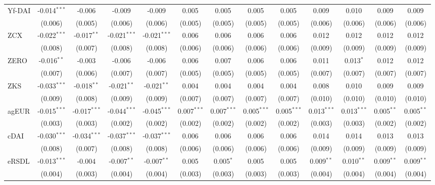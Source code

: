 \begin{table}[!htbp]
\begin{tabular}{@{\extracolsep{5pt}}lcccccccccccc}
 Yf-DAI & -0.014$^{***}$ & -0.006$^{}$ & -0.009$^{}$ & -0.009$^{}$ & 0.005$^{}$ & 0.005$^{}$ & 0.005$^{}$ & 0.005$^{}$ & 0.009$^{}$ & 0.010$^{}$ & 0.009$^{}$ & 0.009$^{}$ \\
  & (0.006) & (0.005) & (0.006) & (0.006) & (0.005) & (0.005) & (0.005) & (0.005) & (0.006) & (0.006) & (0.006) & (0.006) \\
 ZCX & -0.022$^{***}$ & -0.017$^{**}$ & -0.021$^{***}$ & -0.021$^{***}$ & 0.006$^{}$ & 0.006$^{}$ & 0.006$^{}$ & 0.006$^{}$ & 0.012$^{}$ & 0.012$^{}$ & 0.012$^{}$ & 0.012$^{}$ \\
  & (0.008) & (0.007) & (0.008) & (0.008) & (0.006) & (0.006) & (0.006) & (0.006) & (0.009) & (0.009) & (0.009) & (0.009) \\
 ZERO & -0.016$^{**}$ & -0.003$^{}$ & -0.006$^{}$ & -0.006$^{}$ & 0.006$^{}$ & 0.007$^{}$ & 0.006$^{}$ & 0.006$^{}$ & 0.011$^{}$ & 0.013$^{*}$ & 0.012$^{}$ & 0.012$^{}$ \\
  & (0.007) & (0.006) & (0.007) & (0.007) & (0.005) & (0.005) & (0.005) & (0.005) & (0.007) & (0.007) & (0.007) & (0.007) \\
 ZKS & -0.033$^{***}$ & -0.018$^{**}$ & -0.021$^{**}$ & -0.021$^{**}$ & 0.004$^{}$ & 0.004$^{}$ & 0.004$^{}$ & 0.004$^{}$ & 0.008$^{}$ & 0.010$^{}$ & 0.009$^{}$ & 0.009$^{}$ \\
  & (0.009) & (0.008) & (0.009) & (0.009) & (0.007) & (0.007) & (0.007) & (0.007) & (0.010) & (0.010) & (0.010) & (0.010) \\
 agEUR & -0.015$^{***}$ & -0.017$^{***}$ & -0.044$^{***}$ & -0.045$^{***}$ & 0.007$^{***}$ & 0.007$^{***}$ & 0.005$^{***}$ & 0.005$^{***}$ & 0.013$^{***}$ & 0.013$^{***}$ & 0.005$^{**}$ & 0.005$^{**}$ \\
  & (0.003) & (0.003) & (0.002) & (0.002) & (0.002) & (0.002) & (0.002) & (0.002) & (0.003) & (0.003) & (0.002) & (0.002) \\
 cDAI & -0.030$^{***}$ & -0.034$^{***}$ & -0.037$^{***}$ & -0.037$^{***}$ & 0.006$^{}$ & 0.006$^{}$ & 0.006$^{}$ & 0.006$^{}$ & 0.014$^{}$ & 0.014$^{}$ & 0.013$^{}$ & 0.013$^{}$ \\
  & (0.008) & (0.007) & (0.008) & (0.008) & (0.006) & (0.006) & (0.006) & (0.006) & (0.009) & (0.009) & (0.009) & (0.009) \\
 eRSDL & -0.013$^{***}$ & -0.004$^{}$ & -0.007$^{**}$ & -0.007$^{**}$ & 0.005$^{}$ & 0.005$^{*}$ & 0.005$^{}$ & 0.005$^{}$ & 0.009$^{**}$ & 0.010$^{**}$ & 0.009$^{**}$ & 0.009$^{**}$ \\
  & (0.004) & (0.003) & (0.004) & (0.004) & (0.003) & (0.003) & (0.003) & (0.003) & (0.004) & (0.004) & (0.004) & (0.004) \\

\end{tabular}
\end{table}
